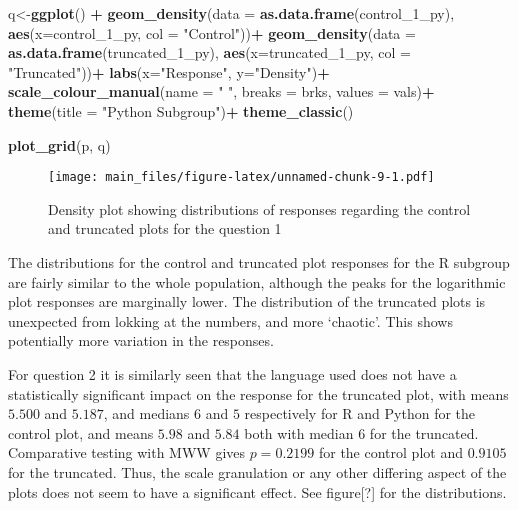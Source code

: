 \documentclass[
]{article}
\newenvironment{Shaded}{\begin{snugshade}}{\end{snugshade}}
\newcommand{\DataTypeTok}[1]{\textcolor[rgb]{0.13,0.29,0.53}{#1}}
\newcommand{\DecValTok}[1]{\textcolor[rgb]{0.00,0.00,0.81}{#1}}
\newcommand{\KeywordTok}[1]{\textcolor[rgb]{0.13,0.29,0.53}{\textbf{#1}}}
\newcommand{\NormalTok}[1]{#1}
\newcommand{\OperatorTok}[1]{\textcolor[rgb]{0.81,0.36,0.00}{\textbf{#1}}}
\newcommand{\StringTok}[1]{\textcolor[rgb]{0.31,0.60,0.02}{#1}}
\begin{document}
\begin{Shaded}
\begin{Highlighting}[]
\NormalTok{q<-}\KeywordTok{ggplot}\NormalTok{() }\OperatorTok{+}
\StringTok{  }\KeywordTok{geom_density}\NormalTok{(}\DataTypeTok{data =} \KeywordTok{as.data.frame}\NormalTok{(control_}\DecValTok{1}\NormalTok{_py), }\KeywordTok{aes}\NormalTok{(}\DataTypeTok{x=}\NormalTok{control_}\DecValTok{1}\NormalTok{_py, }\DataTypeTok{col =} \StringTok{"Control"}\NormalTok{))}\OperatorTok{+}
\StringTok{  }\KeywordTok{geom_density}\NormalTok{(}\DataTypeTok{data =} \KeywordTok{as.data.frame}\NormalTok{(truncated_}\DecValTok{1}\NormalTok{_py), }\KeywordTok{aes}\NormalTok{(}\DataTypeTok{x=}\NormalTok{truncated_}\DecValTok{1}\NormalTok{_py, }\DataTypeTok{col =} \StringTok{"Truncated"}\NormalTok{))}\OperatorTok{+}
\StringTok{  }\KeywordTok{labs}\NormalTok{(}\DataTypeTok{x=}\StringTok{"Response"}\NormalTok{, }\DataTypeTok{y=}\StringTok{"Density"}\NormalTok{)}\OperatorTok{+}
\StringTok{  }\KeywordTok{scale_colour_manual}\NormalTok{(}\DataTypeTok{name =} \StringTok{" "}\NormalTok{, }\DataTypeTok{breaks =}\NormalTok{ brks, }\DataTypeTok{values =}\NormalTok{ vals)}\OperatorTok{+}
\StringTok{  }\KeywordTok{theme}\NormalTok{(}\DataTypeTok{title =} \StringTok{"Python Subgroup"}\NormalTok{)}\OperatorTok{+}
\StringTok{  }\KeywordTok{theme_classic}\NormalTok{()}
\end{Highlighting}
\end{Shaded}

\begin{Shaded}
\begin{Highlighting}[]
\KeywordTok{plot_grid}\NormalTok{(p, q)}
\end{Highlighting}
\end{Shaded}

\begin{figure}
\centering
\texttt{[image: main\_files/figure-latex/unnamed-chunk-9-1.pdf]}
\caption{Density plot showing distributions of responses regarding the
control and truncated plots for the question 1}
\end{figure}

The distributions for the control and truncated plot responses for the R
subgroup are fairly similar to the whole population, although the peaks
for the logarithmic plot responses are marginally lower. The
distribution of the truncated plots is unexpected from lokking at the
numbers, and more `chaotic'. This shows potentially more variation in
the responses.

For question 2 it is similarly seen that the language used does not have
a statistically significant impact on the response for the truncated
plot, with means \(5.500\) and \(5.187\), and medians \(6\) and \(5\)
respectively for R and Python for the control plot, and means \(5.98\)
and \(5.84\) both with median \(6\) for the truncated. Comparative
testing with MWW gives \(p=0.2199\) for the control plot and \(0.9105\)
for the truncated. Thus, the scale granulation or any other differing
aspect of the plots does not seem to have a significant effect. See
figure{[}?{]} for the distributions.
\end{document}
